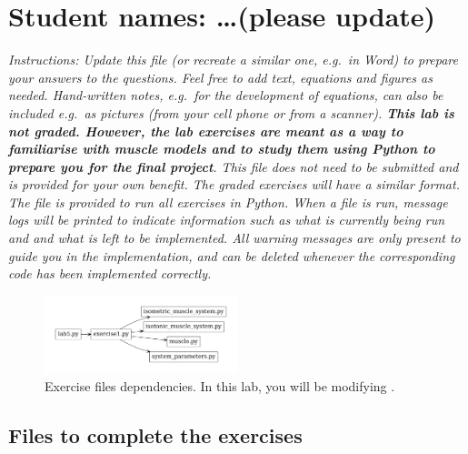 \documentclass{cmc}
\begin{document}
\pagestyle{fancy}
 

\section*{Student names: \ldots (please update)}
\textit{Instructions: Update this file (or recreate a similar one,
  e.g.\ in Word) to prepare your answers to the questions. Feel free
  to add text, equations and figures as needed. Hand-written notes,
  e.g.\ for the development of equations, can also be included e.g.\
  as pictures (from your cell phone or from a scanner).
  \textbf{This lab is not graded. However, the lab exercises are meant as a way
    to familiarise with muscle models and to study them using
    Python to prepare you for the final project}. This file does not
  need to be submitted and is provided for your own benefit. The
  graded exercises will have a similar format.}
\\

\textit{The file  is provided to run all exercises
  in Python.
  When a file is run, message logs will be printed to indicate
  information such as what is currently being run and and what is left
  to be implemented. All warning messages are only present to guide
  you in the implementation, and can be deleted whenever the
  corresponding code has been implemented correctly.}


\begin{figure}[ht]
  \centering \includegraphics[width=0.5\textwidth]{figures/files}
  \caption{\label{fig:files} Exercise files dependencies. In this
  lab, you will be modifying \fileref{exercise1.py}.}
\end{figure}

\subsection*{Files to complete the exercises}
\label{sec:intro}
\end{document}
